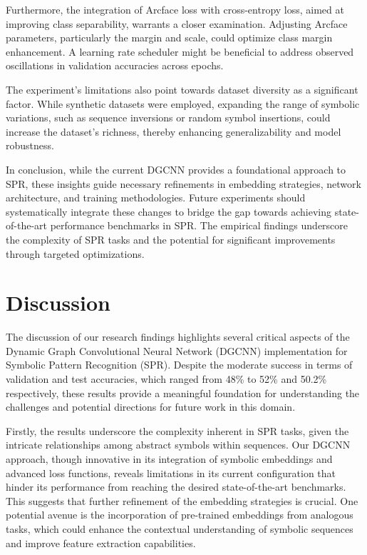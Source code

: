 \documentclass{article}
\begin{document}
Furthermore, the integration of Arcface loss with cross-entropy loss, aimed at improving class separability, warrants a closer examination. Adjusting Arcface parameters, particularly the margin and scale, could optimize class margin enhancement. A learning rate scheduler might be beneficial to address observed oscillations in validation accuracies across epochs.

The experiment's limitations also point towards dataset diversity as a significant factor. While synthetic datasets were employed, expanding the range of symbolic variations, such as sequence inversions or random symbol insertions, could increase the dataset's richness, thereby enhancing generalizability and model robustness.

In conclusion, while the current DGCNN provides a foundational approach to SPR, these insights guide necessary refinements in embedding strategies, network architecture, and training methodologies. Future experiments should systematically integrate these changes to bridge the gap towards achieving state-of-the-art performance benchmarks in SPR. The empirical findings underscore the complexity of SPR tasks and the potential for significant improvements through targeted optimizations.

\section{Discussion}
The discussion of our research findings highlights several critical aspects of the Dynamic Graph Convolutional Neural Network (DGCNN) implementation for Symbolic Pattern Recognition (SPR). Despite the moderate success in terms of validation and test accuracies, which ranged from 48\% to 52\% and 50.2\% respectively, these results provide a meaningful foundation for understanding the challenges and potential directions for future work in this domain.

Firstly, the results underscore the complexity inherent in SPR tasks, given the intricate relationships among abstract symbols within sequences. Our DGCNN approach, though innovative in its integration of symbolic embeddings and advanced loss functions, reveals limitations in its current configuration that hinder its performance from reaching the desired state-of-the-art benchmarks. This suggests that further refinement of the embedding strategies is crucial. One potential avenue is the incorporation of pre-trained embeddings from analogous tasks, which could enhance the contextual understanding of symbolic sequences and improve feature extraction capabilities.
\end{document}
